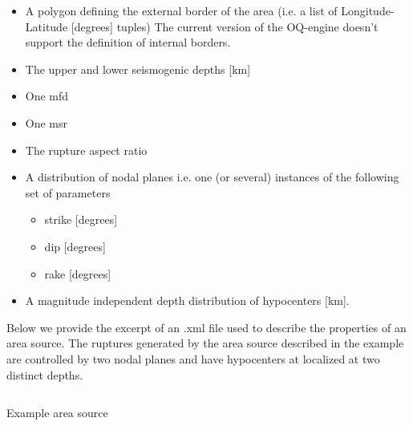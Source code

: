 \begin{itemize}

    \item A polygon defining the external border of the area (i.e. a list of
    Longitude-Latitude [degrees] tuples) The current version of the OQ-engine doesn't
    support the definition of internal borders.

    \item The upper and lower seismogenic depths [km]

    \item One \gls{mfd}

    \item One \gls{msr}

    \item The rupture aspect ratio

    \item A distribution of nodal planes i.e. one (or several) instances of
    the following set of parameters

    \begin{itemize}
        \item \gls{strike} [degrees]
        \item \gls{dip} [degrees]
        \item \gls{rake} [degrees]
    \end{itemize}

    \item A magnitude independent depth distribution of hypocenters [km].

\end{itemize}

Below we provide the excerpt of an .xml file used to describe the properties of an area source. The ruptures generated by the area source described in the example are controlled by two nodal planes and have hypocenters at localized at two distinct depths.

\begin{listing}[htbp]
  \inputminted[firstline=1,firstnumber=1,fontsize=\footnotesize,frame=single,linenos,bgcolor=lightgray]{xml}{oqum/hazard/verbatim/input_area_source.xml}
  \caption{Example area source}
  \label{lst:area_source}
\end{listing}



